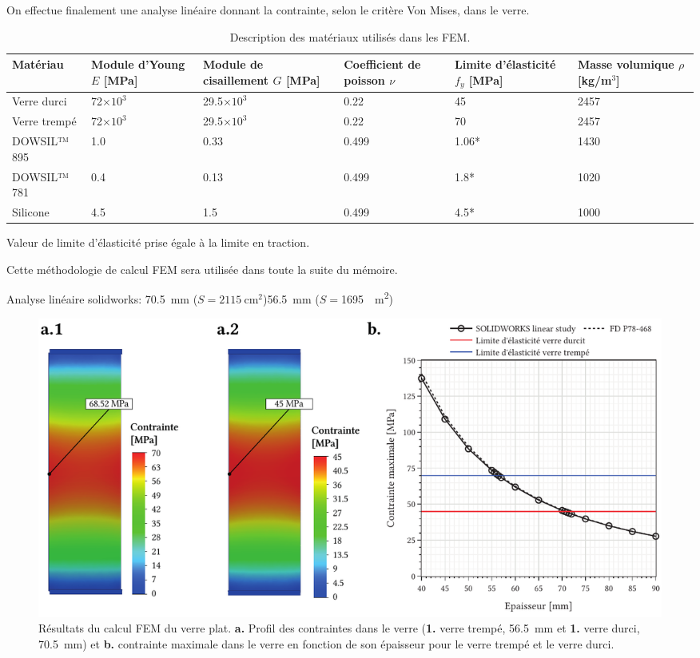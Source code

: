 \documentclass[11pt,titlepage]{article}
\begin{document}
On effectue finalement une analyse linéaire donnant la contrainte, selon le critère Von Mises, dans le verre. 

\begin{table}[H]
\begin{center}
\caption{Description des matériaux utilisés dans les \acrshort{FEM}.}
\label{tab:mat_autoportant}
\begin{tabularx}{\textwidth}{l*{5}{Y}}
\toprule
\textbf{Matériau} & \textbf{Module d'Young} $E$ [MPa] & \textbf{Module de cisaillement} $G$ [MPa]&\textbf{Coefficient de poisson} $\nu$ & \textbf{Limite d'élasticité} $f_y$ [MPa]& \textbf{Masse volumique} $\rho$ [kg/m$^3$] \\\midrule
Verre durci & 72$\times 10^3$ & 29.5$\times 10^3$ & 0.22 &45 & 2457 \\
Verre trempé & 72$\times 10^3$ & 29.5$\times 10^3$ & 0.22 &70 & 2457 \\
DOWSIL™ 895 & 1.0 & 0.33 & 0.499 & 1.06* & 1430 \\
DOWSIL™ 781 & 0.4 & 0.13 & 0.499 & 1.8* & 1020 \\
Silicone & 4.5 & 1.5 & 0.499 & 4.5* & 1000\\
\bottomrule
\end{tabularx}
\end{center}
{\RaggedLeft \footnotesize * Valeur de limite d'élasticité prise égale à la limite en traction.}\end{table}

Cette méthodologie de calcul \acrshort{FEM} sera utilisée dans toute la suite du mémoire.

Analyse linéaire solidworks: \qty{70.5}{\milli\meter} ($S= \qty{2115}{\centi\square\meter}$)\qty{56.5}{\milli\meter} ($S=$\SI{1695}{\centi\square\meter})

\begin{figure}[H]
    \centering
    \includegraphics[width=\textwidth]{img/plat/dim_fem.pdf}
    \caption{Résultats du calcul \acrshort{FEM} du verre plat. \textbf{a.} Profil des contraintes dans le verre (\textbf{1.} verre trempé, \qty{56.5}{\milli\meter} et \textbf{1.} verre durci, \qty{70.5}{\milli\meter}) et \textbf{b.} contrainte maximale dans le verre en fonction de son épaisseur pour le verre trempé et le verre durci.}
    \label{fig:fem_plat_dim}
\end{figure}
\end{document}

